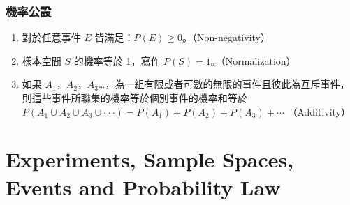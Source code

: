 \documentclass{beamer}
\begin{document}
\begin{frame}\frametitle{機率公設}
\begin{theorem}
\begin{enumerate}
\item 對於任意事件 $E$ 皆滿足：$P(E) \geq 0$。（Non-negativity）
\item 樣本空間 $S$ 的機率等於 1，寫作 $P(S) = 1$。（Normalization）
\item 如果 $A_{1}$，$A_{2}$，$A_{3}$\ldots ，為一組有限或者可數的無限的事件且彼此為互斥事件，則這些事件所聯集的機率等於個別事件的機率和等於\newline
$P(A_{1} \cup A_{2} \cup A_{3} ∪ · · ·) = P(A_{1}) + P(A_{2}) + P(A_{3}) + \cdots$ （Additivity）
\end{enumerate}
\end{theorem}
\end{frame}

\section{Experiments, Sample Spaces, Events and Probability Law}  %
\end{document}
